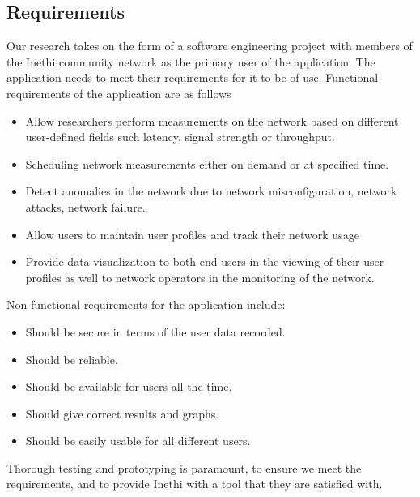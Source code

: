 \subsection{Requirements}
Our research takes on the form of a software engineering project with members of the Inethi community network as the primary user of the application. The application needs to meet their requirements for it to be of use.
Functional requirements of the application are as follows 
\begin{itemize} %
	\item Allow researchers perform measurements on the network based on different user-defined fields such latency, signal strength or throughput. %
	\item Scheduling network measurements either on demand or at specified time. %
	\item Detect anomalies in the network due to network misconfiguration, network attacks, network failure. 
	\item Allow users to maintain user profiles and track their network usage
	\item Provide data visualization to both end users in the viewing of their user profiles as well to network operators in the monitoring of the network.
\end{itemize}
Non-functional requirements for the application include:
\begin{itemize}
	\item Should be secure in terms of the user data recorded.
	\item Should be reliable.
	\item Should be available for users all the time.
	\item Should  give correct results and graphs.
	\item Should be easily usable for all different users.
\end{itemize}
Thorough testing and prototyping is paramount, to ensure we meet the requirements, and to provide Inethi with a tool that they are satisfied with.
